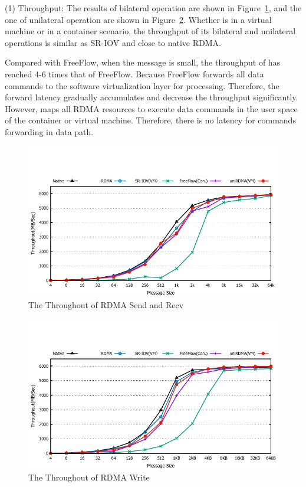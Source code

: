 (1) Throughput: The results of bilateral operation are shown in Figure~\ref{fig:send-bw}, and the one of unilateral operation are shown in Figure~\ref{fig:write-bw}. Whether \sys is in a virtual machine or in a container scenario, the throughput of its bilateral and unilateral operations is similar as SR-IOV and close to native RDMA.

Compared with FreeFlow, when the message is small, the throughput of \sys has reached 4-6 times that of FreeFlow. Because FreeFlow forwards all data commands to the software virtualization layer for processing. Therefore, the forward latency gradually accumulates and decrease the throughput significantly. However, \sys maps all RDMA resources to execute data commands in the user space of the container or virtual machine. Therefore, there is no latency for commands forwarding in data path.

\begin{figure}[!ht]
	\centering
	\includegraphics[width=1.0\linewidth]{images/send-bw.pdf}
	\caption{The Throughout of RDMA Send and Recv}
	\label{fig:send-bw}
\end{figure}

\begin{figure}[!ht]
	\centering
	\includegraphics[width=1.0\linewidth]{images/write-bw.pdf}
	\caption{The Throughout of RDMA Write}
	\label{fig:write-bw}
\end{figure}

